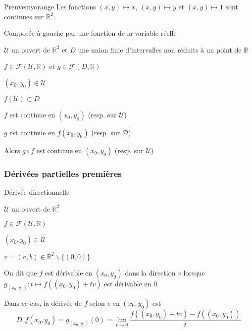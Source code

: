     \begin{demo}{Preuve}{myorange}
        Les fonctions $(x,y) \mapsto x$, $(x,y) \mapsto y$ et $(x,y) \mapsto 1$ sont continues sur $\mathbb{R}^2$.
    \end{demo}

    \begin{prop}{Composée à gauche par une fonction de la variable réelle}{}
        \begin{soient}
            \item $\mathcal{U}$ un ouvert de $\mathbb{R}^2$ et $D$ une union finie d’intervalles non réduits à un point de $\mathbb{R}$
            \item $f \in \mathcal{F}(\mathcal{U},\mathbb{R})$ et $g \in \mathcal{F}(D,\mathbb{R})$
            \item $(x_0,y_0) \in \mathcal{U}$
        \end{soient}
        \begin{suppose}
            \item $f(\mathcal{U}) \subset D$
            \item $f$ est continue en $(x_0,y_0)$ (resp. sur $\mathcal{U}$)
            \item $g$ est continue en $f(x_0,y_0)$ (resp. sur $\mathcal{D}$)
        \end{suppose}
        Alors $g \circ f$ est continue en $(x_0,y_0)$ (resp. sur $\mathcal{U}$)
    \end{prop}

    \subsubsection{Dérivées partielles premières}

    \begin{defi}{Dérivée directionnelle}{}
        \begin{soient}
            \item $\mathcal{U}$ un ouvert de $\mathbb{R}^2$
            \item $f \in \mathcal{F}(\mathcal{U},\mathbb{R})$
            \item $(x_0,y_0) \in \mathcal{U}$
            \item $v = (a,b) \in \mathbb{R}^2 \backslash \{ (0,0) \}$
        \end{soient}
        On dit que $f$ est dérivable en $(x_0,y_0)$ dans la direction $v$ lorsque $g_{(x_0,y_0)} : t \mapsto f((x_0,y_0)+tv)$ est dérivable en 0. 
        
        Dans ce cas, la dérivée de $f$ selon $v$ en $(x_0,y_0)$ est 
        \[D_v f(x_0,y_0) = g_{(x_0,y_0)}(0) = \lim\limits_{t \rightarrow 0} \frac{f((x_0,y_0)+tv) - f((x_0,y_0))}{t} \]
    \end{defi}

